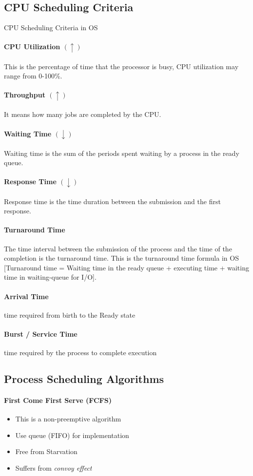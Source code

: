 \subsection{CPU Scheduling Criteria} CPU Scheduling Criteria in OS
\paragraph{CPU Utilization $(\uparrow)$} This is the percentage of time that the processor is busy, CPU utilization may range from 0-100\%.
\paragraph{Throughput $(\uparrow)$} It means how many jobs are completed by the CPU.
\paragraph{Waiting Time $(\downarrow)$} Waiting time is the sum of the periods spent waiting by a process in the ready queue.
\paragraph{Response Time $(\downarrow)$} Response time is the time duration between the submission and the first response.
\paragraph{Turnaround Time} The time interval between the submission of the process and the time of the completion is the turnaround time. This is the turnaround time formula in OS [Turnaround time = Waiting time in the ready queue + executing time + waiting time in waiting-queue for I/O].
\paragraph{Arrival Time} time required from birth to the Ready state
\paragraph{Burst / Service Time} time required by the process to complete execution

\subsection{Process Scheduling Algorithms}
\paragraph{First Come First Serve (FCFS)}
\begin{itemize}
	\item This is a non-preemptive algorithm
	\item Use queue (FIFO) for implementation
    \item Free from Starvation
    \item Suffers from \textit{convoy effect}
\end{itemize}
